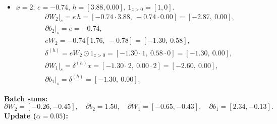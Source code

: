 \documentclass[11pt]{article}
\begin{document}
\begin{itemize}
\begin{align*}
&\partial b_2\big|_s = e = 1.11,\\
&eW_2 = 1.11[1.76,\ -0.78] = [1.95,\ -0.87],\\
&\delta^{(h)} = eW_2 \odot 1_{z>0} = [1.95\cdot1,\ -0.87\cdot0] = [1.95,\ 0.00],\\
&\partial W_1\big|_s = \delta^{(h)} x = [1.95\cdot1,\ 0.00\cdot1] = [1.95,\ 0.00],\\
&\partial b_1\big|_s = \delta^{(h)} = [1.95,\ 0.00].
\end{align*}
\item $x=2$: $e=-0.74$, $h=[3.88, 0.00]$, $1_{z>0}=[1,0]$.
\begin{align*}
&\partial W_2\big|_s = e\,h = [-0.74\cdot3.88,\ -0.74\cdot0.00] = [-2.87,\ 0.00],\\
&\partial b_2\big|_s = e = -0.74,\\
&eW_2 = -0.74[1.76,\ -0.78] = [-1.30,\ 0.58],\\
&\delta^{(h)} = eW_2 \odot 1_{z>0} = [-1.30\cdot1,\ 0.58\cdot0] = [-1.30,\ 0.00],\\
&\partial W_1\big|_s = \delta^{(h)} x = [-1.30\cdot2,\ 0.00\cdot2] = [-2.60,\ 0.00],\\
&\partial b_1\big|_s = \delta^{(h)} = [-1.30,\ 0.00].
\end{align*}
\end{itemize}
\noindent\textbf{Batch sums:}
\[
\partial W_2=[-0.26, -0.45],\quad \partial b_2=1.50,\quad \partial W_1=[-0.65, -0.43],\quad \partial b_1=[2.34, -0.13].
\]
\noindent\textbf{Update ($\alpha=0.05$):}
\end{document}
